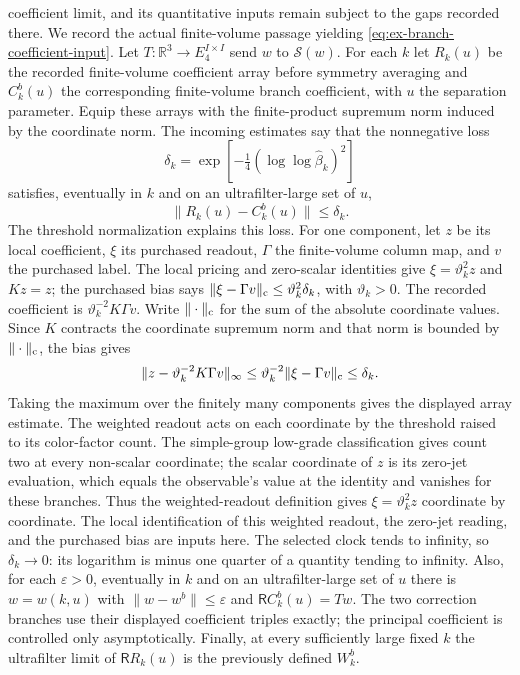coefficient limit, and its quantitative inputs remain subject to the gaps
recorded there. We record the actual finite-volume passage yielding
\eqref{eq:ex-branch-coefficient-input}. Let $T:\mathbb R^3\to
E_4^{I\times I}$ send $w$ to $\mathcal S(w)$. For each $k$ let
$R_k(u)$ be the recorded finite-volume coefficient array before symmetry
averaging and $C^b_k(u)$ the corresponding finite-volume branch
coefficient, with $u$ the separation parameter. Equip these arrays with
the finite-product supremum norm induced by the coordinate norm.
The incoming estimates say that the nonnegative loss
\[
 \delta_k=\exp\!\left[-\tfrac14(\log\log\widehat\beta_k)^2\right]
\]
satisfies, eventually in $k$ and on an ultrafilter-large set of $u$,
\[
 \|R_k(u)-C^b_k(u)\|\le\delta_k.
\]
The threshold normalization explains this loss. For one component, let
$z$ be its local coefficient, $\xi$ its purchased readout, $\Gamma$ the
finite-volume column map, and $v$ the purchased label. The local pricing
and zero-scalar identities give $\xi=\vartheta_k^2z$ and $Kz=z$; the
purchased bias says
$\|\xi-\Gamma v\|_{\rm c}\le\vartheta_k^2\delta_k$, with
$\vartheta_k>0$. The recorded coefficient is
$\vartheta_k^{-2}K\Gamma v$. Write $\|\cdot\|_{\rm c}$ for the sum of
the absolute coordinate values. Since $K$ contracts the coordinate supremum
norm and that norm is bounded by $\|\cdot\|_{\rm c}$,
the bias gives
\[
 \|z-\vartheta_k^{-2}K\Gamma v\|_\infty
 \le\vartheta_k^{-2}\|\xi-\Gamma v\|_{\rm c}\le\delta_k.
\]
Taking the maximum over the finitely many components gives the displayed
array estimate. The weighted readout acts on each coordinate by the
threshold raised to its color-factor count. The simple-group low-grade
classification gives count two at every non-scalar coordinate; the scalar
coordinate of $z$ is its zero-jet evaluation, which equals the observable's
value at the identity and vanishes for these branches. Thus the weighted-readout definition gives
$\xi=\vartheta_k^2z$ coordinate by coordinate. The local identification
of this weighted readout, the zero-jet reading, and the purchased bias are
inputs here.
The selected clock tends to infinity, so $\delta_k\to0$: its logarithm is
minus one quarter of a quantity tending to infinity. Also, for each $\varepsilon>0$, eventually in $k$ and on an
ultrafilter-large set of $u$ there is $w=w(k,u)$ with
$\|w-w^b\|\le\varepsilon$ and $\mathsf R C^b_k(u)=T w$. The two
correction branches use their displayed coefficient triples exactly;
the principal coefficient is controlled only asymptotically. Finally,
at every sufficiently large fixed $k$ the ultrafilter limit of
$\mathsf R R_k(u)$ is the previously defined $W^b_k$.

